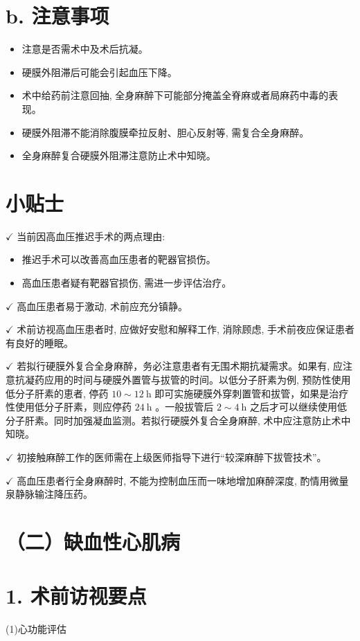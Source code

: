 \documentclass[10pt]{article}
\begin{document}
\section*{b. 注意事项}
\begin{itemize}
  \item 注意是否需术中及术后抗凝。
  \item 硬膜外阻滞后可能会引起血压下降。
  \item 术中给药前注意回抽, 全身麻醉下可能部分掩盖全脊麻或者局麻药中毒的表现。
  \item 硬膜外阻滞不能消除腹膜牵拉反射、胆心反射等, 需复合全身麻醉。
  \item 全身麻醉复合硬膜外阻滞注意防止术中知晓。
\end{itemize}

\section*{小贴士}
$\checkmark$ 当前因高血压推迟手术的两点理由:

\begin{itemize}
  \item 推迟手术可以改善高血压患者的靶器官损伤。
  \item 高血压患者疑有靶器官损伤, 需进一步评估治疗。
\end{itemize}

$\checkmark$ 高血压患者易于激动, 术前应充分镇静。

$\checkmark$ 术前访视高血压患者时, 应做好安慰和解释工作, 消除顾虑, 手术前夜应保证患者有良好的睡眠。

$\checkmark$ 若拟行硬膜外复合全身麻醉，务必注意患者有无围术期抗凝需求。如果有, 应注意抗凝药应用的时间与硬膜外置管与拔管的时间。以低分子肝素为例, 预防性使用低分子肝素的恵者, 停药 $10 \sim 12 \mathrm{~h}$ 即可实施硬膜外穿刺置管和拔管，如果是治疗性使用低分子肝素，则应停药 $24 \mathrm{~h}$ 。一般拔管后 $2 \sim 4 \mathrm{~h}$ 之后才可以继续使用低分子肝素。同时加强凝血监测。若拟行硬膜外复合全身麻醉, 术中应注意防止术中知晓。

$\checkmark$ 初接触麻醉工作的医师需在上级医师指导下进行“较深麻醉下拔管技术”。

$\checkmark$ 高血压患者行全身麻醉时, 不能为控制血压而一味地增加麻醉深度, 酌情用微量泉静脉输注降压药。

\section*{（二）缺血性心肌病}
\section*{1. 术前访视要点}
(1)心功能评估
\end{document}
